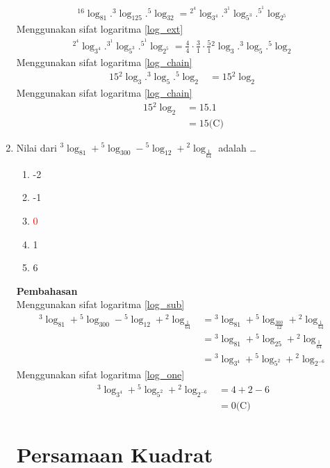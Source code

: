 \documentclass{report}
\newcommand{\options}[5]{
\begin{enumerate}[label=\alph*.]
	\item #1
	\item #2
	\item #3
	\item #4
	\item #5
\end{enumerate}
}
\newcommand{\pemb}{ \textbf{Pembahasan} \\}
\begin{document}
\begin{enumerate}
\begin{align*}
	{}^{16}\log_{81}.{}^{3}\log_{125}.{}^{5}\log_{32} = {}^{2^{4}}\log_{3^{4}}.{}^{3^1}\log_{5^3}.{}^{5^1}\log_{2^5}
\end{align*}
Menggunakan sifat logaritma \ref{log_ext}
\begin{align*}
	{}^{2^{4}}\log_{3^{4}}.{}^{3^1}\log_{5^3}.{}^{5^1}\log_{2^5} = \frac{4}{4}\cdot\frac{3}{1}\cdot\frac{5}{1}{}^{2}\log_{3}.{}^{3}\log_{5}.{}^{5}\log_{2}
\end{align*}
Menggunakan sifat logaritma \ref{log_chain}
\begin{align*}
	15{}^{2}\log_{3}.{}^{3}\log_{5}.{}^{5}\log_{2} 
	&= 15 {}^{2}\log_{2} 
\end{align*}
Menggunakan sifat logaritma \ref{log_chain}
\begin{align*}
	15 {}^{2}\log_{2} 
	&= 15.1 \\
	&= 15 \text{(C)}
\end{align*}

\item
Nilai dari ${}^{3}\log_{81}+{}^{5}\log_{300}-{}^{5}\log_{12}+{}^{2}\log_{\frac{1}{64}}$ adalah \ldots
\options
{-2}
{-1}
{\textcolor{red}0}
{1}
{6}
\pemb
Menggunakan sifat logaritma \ref{log_sub}
\begin{align*}
	{}^{3}\log_{81}+{}^{5}\log_{300}-{}^{5}\log_{12}+{}^{2}\log_{\frac{1}{64}} 
	&= {}^{3}\log_{81}+{}^{5}\log_{\frac{300}{12}}+{}^{2}\log_{\frac{1}{64}} \\
	&= {}^{3}\log_{81}+{}^{5}\log_{25}+{}^{2}\log_{\frac{1}{64}} \\
	&= {}^{3}\log_{3^4}+{}^{5}\log_{5^2}+{}^{2}\log_{2^{-6}} 
\end{align*}
Menggunakan sifat logaritma \ref{log_one}
\begin{align*}
	{}^{3}\log_{3^4}+{}^{5}\log_{5^2}+{}^{2}\log_{2^{-6}} 
	&= 4 + 2 - 6 \\
	&= 0 \text{(C)}
\end{align*}

\chapter{Persamaan Kuadrat}


\end{enumerate}
\end{document}
